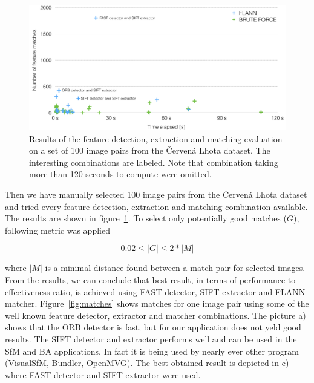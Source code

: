 \begin{figure}[!htbp]
	\begin{center}
		\includegraphics[keepaspectratio,width=\textwidth]{fig/matchers.pdf}
	\end{center}
	\caption{Results of the feature detection, extraction and matching evaluation on a set of 100 image pairs from the Červená Lhota dataset. The interesting combinations are labeled. Note that combination taking more than 120 seconds to compute were omitted.}
	\label{fig:matchers}
\end{figure}

Then we have manually selected 100 image pairs from the Červená Lhota dataset and tried every feature detection, extraction and matching combination available. The results are shown in figure~\ref{fig:matchers}. To select only potentially good matches ($G$), following metric was applied

\begin{equation}
	0.02 \leq |G| \leq 2* |M|
\end{equation}

where $|M|$ is a minimal distance found between a match pair for selected images. From the results, we can conclude that best result, in terms of performance to effectiveness ratio, is achieved using FAST detector, SIFT extractor and FLANN matcher. Figure~\ref{fig:matches} shows matches for one image pair using some of the well known feature detector, extractor and matcher combinations. The picture a) shows that the ORB detector is fast, but for our application does not yeld good results. The SIFT detector and extractor performs well and can be used in the SfM and BA applications. In fact it is being used by nearly ever other program (VisualSfM, Bundler, OpenMVG). The best obtained result is depicted in c) where FAST detector and SIFT extractor were used.

